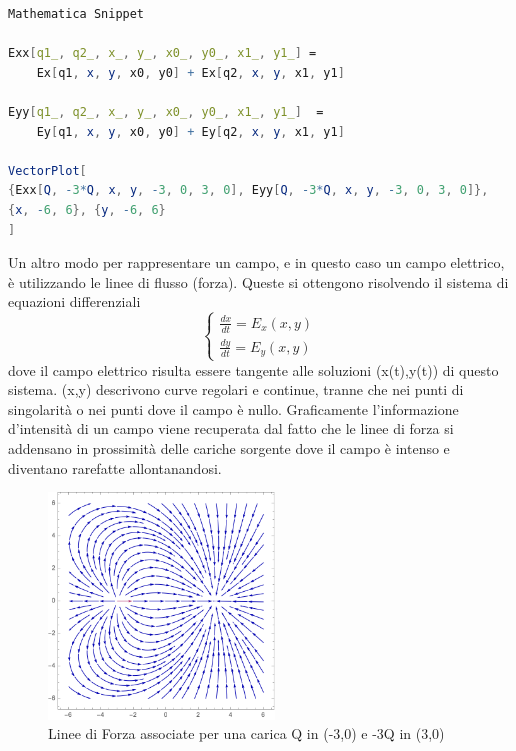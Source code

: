 \begin{lstlisting}[language = Mathematica]
Mathematica Snippet 

Exx[q1_, q2_, x_, y_, x0_, y0_, x1_, y1_] =  
	Ex[q1, x, y, x0, y0] + Ex[q2, x, y, x1, y1]

Eyy[q1_, q2_, x_, y_, x0_, y0_, x1_, y1_]  = 
	Ey[q1, x, y, x0, y0] + Ey[q2, x, y, x1, y1]

VectorPlot[
{Exx[Q, -3*Q, x, y, -3, 0, 3, 0], Eyy[Q, -3*Q, x, y, -3, 0, 3, 0]}, 
{x, -6, 6}, {y, -6, 6}
]
\end{lstlisting}
Un altro modo per rappresentare un campo, e in questo caso un campo elettrico, \`e utilizzando le linee di flusso (forza). Queste si ottengono risolvendo il sistema di equazioni differenziali 
\begin{equation*}
\left \{\begin{array}{l}
	\frac{dx}{dt}= E_x(x,y)\\
	\frac{dy}{dt} = E_y(x,y)
	\end{array}\right.
\end{equation*}
dove il campo elettrico risulta essere tangente alle soluzioni (x(t),y(t)) di questo sistema. (x,y) descrivono curve regolari e continue, tranne che nei punti di singolarit\`a o nei punti dove il campo \`e nullo. Graficamente l'informazione d'intensit\`a di un campo viene recuperata dal fatto che le linee di forza si addensano in prossimit\`a delle cariche sorgente dove il campo \`e intenso e diventano rarefatte allontanandosi.

 
\begin{figure}[!ht]
\vspace{0.1in}
\includegraphics[width = 6cm]{images/stream}	
\centering
\vspace{0.1in}
\caption{Linee di Forza associate per una carica Q in (-3,0) e -3Q in (3,0)}
\end{figure}

\newpage

